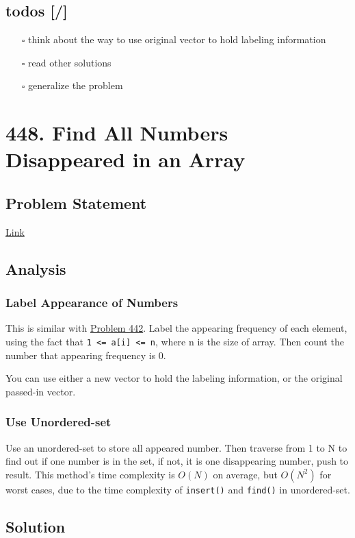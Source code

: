 \documentclass[12pt]{article}
\begin{document}
\subsection{todos [/]}
\label{sec:org113d208}
\begin{itemize}
\item[{$\square$}] think about the way to use original vector to hold labeling information
\item[{$\square$}] read other solutions
\item[{$\square$}] generalize the problem
\end{itemize}
\section{448. Find All Numbers Disappeared in an Array}
\label{sec:org04c7eca}
\subsection{Problem Statement}
\label{sec:orgbfa56d6}
\href{https://leetcode.com/problems/find-all-numbers-disappeared-in-an-array/}{Link}
\subsection{Analysis}
\label{sec:org53371bb}
\subsubsection{Label Appearance of Numbers}
\label{sec:org00c6820}
This is similar with \hyperref[org7c77290]{Problem 442}. Label the appearing frequency of each element, using the fact that \texttt{1 <= a[i] <= n}, where n is the size of array. Then count the number that appearing frequency is 0.

You can use either a new vector to hold the labeling information, or the original passed-in vector.

\subsubsection{Use Unordered-set}
\label{sec:org59114c4}
Use an unordered-set to store all appeared number. Then traverse from 1 to N to find out if one number is in the set, if not, it is one disappearing number, push to result. This method's time complexity is \(O(N)\) on average, but \(O(N^2)\) for worst cases, due to the time complexity of \texttt{insert()} and \texttt{find()} in unordered-set.

\subsection{Solution}
\label{sec:orga448a73}
\end{document}
